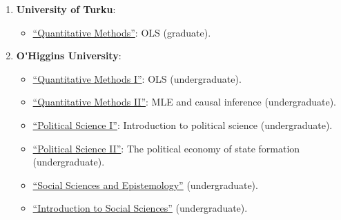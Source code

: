 \begin{enumerate}

  \item {\bf University of Turku}:

      \begin{itemize}
      \item[\textcolor{gray}{\textbullet}] \href{https://github.com/hbahamonde/OLS/raw/master/Bahamonde_OLS.pdf}{``Quantitative Methods''}: {\color{gray}OLS (graduate)}.
    \end{itemize}


\item {\bf O\'\unskip Higgins University}:
  
    \begin{itemize}
      \item[\textcolor{gray}{\textbullet}] \href{https://github.com/hbahamonde/OLS/raw/master/Bahamonde_OLS.pdf}{``Quantitative Methods I''}: {\color{gray}OLS (undergraduate)}.
      \item[\textcolor{gray}{\textbullet}] \href{https://github.com/hbahamonde/MLE/raw/master/Bahamonde_MLE.pdf}{``Quantitative Methods II''}: {\color{gray}MLE and causal inference (undergraduate)}.
      \item[\textcolor{gray}{\textbullet}] \href{https://github.com/hbahamonde/Ciencia_Politica_I/raw/master/Bahamonde_Ciencia_Politica_I.pdf}{``Political Science I''}: {\color{gray} Introduction to political science (undergraduate)}.
      \item[\textcolor{gray}{\textbullet}] \href{https://github.com/hbahamonde/Ciencia_Politica_II/raw/master/Bahamonde_Ciencia_Politica_II.pdf}{``Political Science II''}: {\color{gray} The political economy of state formation (undergraduate)}.
      \item[\textcolor{gray}{\textbullet}] \href{https://github.com/hbahamonde/Social_Sciences_Epistemology_UGRAD/raw/master/Bahamonde_Social_Sciences_Epistemology_UGRAD_Syllabus.pdf}{``Social Sciences and Epistemology''} {\color{gray} (undergraduate)}.
      \item[\textcolor{gray}{\textbullet}] \href{https://github.com/hbahamonde/Intro_Ciencias_Sociales/raw/master/Bahamonde_Intro_Ciencias_Sociales.pdf}{``Introduction to Social Sciences''} {\color{gray} (undergraduate)}.
    \end{itemize}


\end{enumerate}
